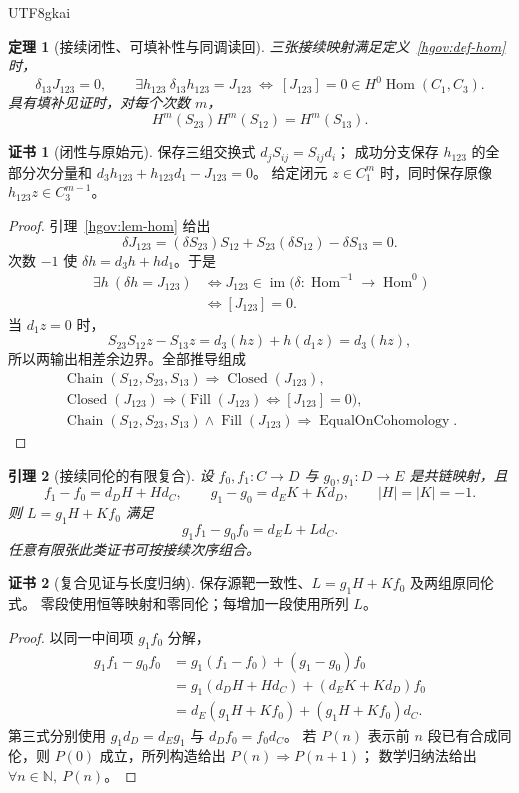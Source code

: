 \documentclass[12pt,a4paper,openany,notitlepage]{report}
\theoremstyle{plain}
\newtheorem{theorem}{定理}[chapter]
\newtheorem{lemma}[theorem]{引理}
\theoremstyle{definition}
\newtheorem*{certificate}{证书}
\theoremstyle{remark}
\begin{document}
\begin{CJK*}{UTF8}{gkai}
\begin{theorem}[接续闭性、可填补性与同调读回]
\label{hgov:thm-filler}
三张接续映射满足定义~\ref{hgov:def-hom} 时，
\[
 \delta_{13}J_{123}=0,
 \qquad
 \exists h_{123}\ \delta_{13}h_{123}=J_{123}
 \ \Longleftrightarrow\
 [J_{123}]=0\in H^0\operatorname{Hom}(C_1,C_3).
\]
具有填补见证时，对每个次数 $m$，
\[
 H^m(S_{23})H^m(S_{12})=H^m(S_{13}).
\]
\end{theorem}
\begin{certificate}[闭性与原始元]
保存三组交换式 $d_jS_{ij}=S_{ij}d_i$；
成功分支保存 $h_{123}$ 的全部分次分量和
$d_3h_{123}+h_{123}d_1-J_{123}=0$。
给定闭元 $z\in C_1^m$ 时，同时保存原像 $h_{123}z\in C_3^{m-1}$。
\end{certificate}
\begin{proof}
引理~\ref{hgov:lem-hom} 给出
\[
 \delta J_{123}
 =(\delta S_{23})S_{12}+S_{23}(\delta S_{12})
   -\delta S_{13}=0.
\]
次数 $-1$ 使
$\delta h=d_3h+h d_1$。于是
\[
 \begin{aligned}
 \exists h\ (\delta h=J_{123})
 &\Longleftrightarrow
 J_{123}\in\operatorname{im}
 \bigl(\delta:\operatorname{Hom}^{-1}\to\operatorname{Hom}^{0}\bigr)\\
 &\Longleftrightarrow [J_{123}]=0.
 \end{aligned}
\]
当 $d_1z=0$ 时，
\[
 S_{23}S_{12}z-S_{13}z
 =d_3(hz)+h(d_1z)=d_3(hz),
\]
所以两输出相差余边界。全部推导组成
\[
 \begin{gathered}
 \operatorname{Chain}(S_{12},S_{23},S_{13})
 \Longrightarrow\operatorname{Closed}(J_{123}),\\
 \operatorname{Closed}(J_{123})
 \Longrightarrow
 \bigl(\operatorname{Fill}(J_{123})\Longleftrightarrow[J_{123}]=0\bigr),\\
 \operatorname{Chain}(S_{12},S_{23},S_{13})
 \wedge\operatorname{Fill}(J_{123})
 \Longrightarrow\operatorname{EqualOnCohomology}.
 \end{gathered}
\]
\end{proof}

\begin{lemma}[接续同伦的有限复合]
\label{hgov:lem-compose-homotopy}
设 $f_0,f_1:C\to D$ 与 $g_0,g_1:D\to E$ 是共链映射，且
\[
 f_1-f_0=d_DH+Hd_C,\qquad
 g_1-g_0=d_EK+Kd_D,
 \qquad |H|=|K|=-1.
\]
则 $L=g_1H+Kf_0$ 满足
\[
 g_1f_1-g_0f_0=d_EL+Ld_C.
\]
任意有限张此类证书可按接续次序组合。
\end{lemma}
\begin{certificate}[复合见证与长度归纳]
保存源靶一致性、$L=g_1H+Kf_0$ 及两组原同伦式。
零段使用恒等映射和零同伦；每增加一段使用所列 $L$。
\end{certificate}
\begin{proof}
以同一中间项 $g_1f_0$ 分解，
\[
 \begin{aligned}
 g_1f_1-g_0f_0
 &=g_1(f_1-f_0)+(g_1-g_0)f_0\\
 &=g_1(d_DH+Hd_C)+(d_EK+Kd_D)f_0\\
 &=d_E(g_1H+Kf_0)+(g_1H+Kf_0)d_C.
 \end{aligned}
\]
第三式分别使用 $g_1d_D=d_Eg_1$ 与 $d_Df_0=f_0d_C$。
若 $P(n)$ 表示前 $n$ 段已有合成同伦，则
$P(0)$ 成立，所列构造给出 $P(n)\Rightarrow P(n+1)$；
数学归纳法给出 $\forall n\in\mathbb N,\ P(n)$。
\end{proof}


\end{CJK*}
\end{document}
